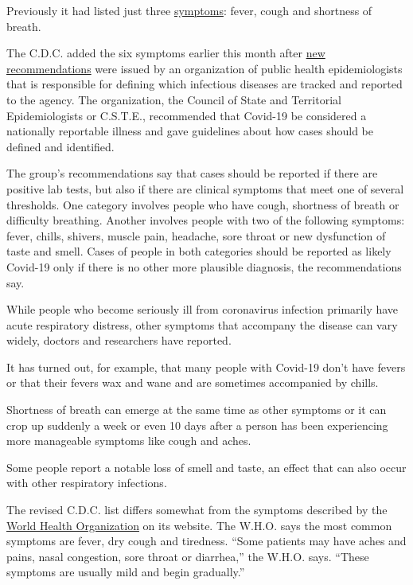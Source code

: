 Previously it had listed just three
\href{https://www.nytimes3xbfgragh.onion/article/coronavirus-symptoms.html}{symptoms}:
fever, cough and shortness of breath.

The C.D.C. added the six symptoms earlier this month after
\href{https://cdn.ymaws.com/www.cste.org/resource/resmgr/2020ps/interim-20-id-01_covid-19.pdf}{new
recommendations} were issued by an organization of public health
epidemiologists that is responsible for defining which infectious
diseases are tracked and reported to the agency. The organization, the
Council of State and Territorial Epidemiologists or C.S.T.E.,
recommended that Covid-19 be considered a nationally reportable illness
and gave guidelines about how cases should be defined and identified.

The group's recommendations say that cases should be reported if there
are positive lab tests, but also if there are clinical symptoms that
meet one of several thresholds. One category involves people who have
cough, shortness of breath or difficulty breathing. Another involves
people with two of the following symptoms: fever, chills, shivers,
muscle pain, headache, sore throat or new dysfunction of taste and
smell. Cases of people in both categories should be reported as likely
Covid-19 only if there is no other more plausible diagnosis, the
recommendations say.

While people who become seriously ill from coronavirus infection
primarily have acute respiratory distress, other symptoms that accompany
the disease can vary widely, doctors and researchers have reported.

It has turned out, for example, that many people with Covid-19 don't
have fevers or that their fevers wax and wane and are sometimes
accompanied by chills.

Shortness of breath can emerge at the same time as other symptoms or it
can crop up suddenly a week or even 10 days after a person has been
experiencing more manageable symptoms like cough and aches.

Some people report a notable loss of smell and taste, an effect that can
also occur with other respiratory infections.

The revised C.D.C. list differs somewhat from the symptoms described by
the
\href{https://www.who.int/news-room/q-a-detail/q-a-coronaviruses}{World
Health Organization} on its website. The W.H.O. says the most common
symptoms are fever, dry cough and tiredness. ``Some patients may have
aches and pains, nasal congestion, sore throat or diarrhea,'' the W.H.O.
says. ``These symptoms are usually mild and begin gradually.''

